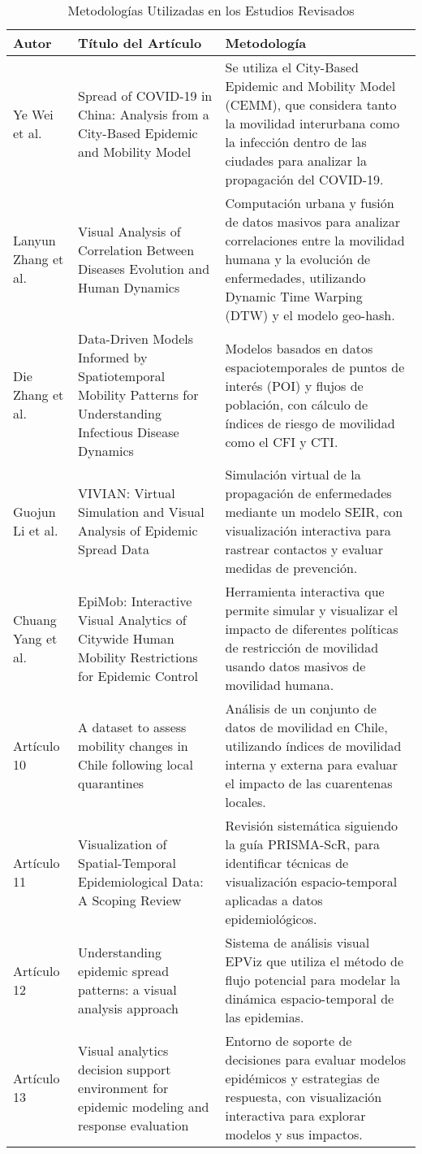 \documentclass[sigconf]{acmart}
\begin{document}
\begin{table*}[h]
\centering
\caption{Metodologías Utilizadas en los Estudios Revisados}
\begin{tabular}{|p{2cm}|p{3cm}|p{10cm}|}
\hline
\textbf{Autor} & \textbf{Título del Artículo} & \textbf{Metodología} \\ \hline
Ye Wei et al. & Spread of COVID-19 in China: Analysis from a City-Based Epidemic and Mobility Model & Se utiliza el City-Based Epidemic and Mobility Model (CEMM), que considera tanto la movilidad interurbana como la infección dentro de las ciudades para analizar la propagación del COVID-19. \\ \hline
Lanyun Zhang et al. & Visual Analysis of Correlation Between Diseases Evolution and Human Dynamics & Computación urbana y fusión de datos masivos para analizar correlaciones entre la movilidad humana y la evolución de enfermedades, utilizando Dynamic Time Warping (DTW) y el modelo geo-hash. \\ \hline
Die Zhang et al. & Data-Driven Models Informed by Spatiotemporal Mobility Patterns for Understanding Infectious Disease Dynamics & Modelos basados en datos espaciotemporales de puntos de interés (POI) y flujos de población, con cálculo de índices de riesgo de movilidad como el CFI y CTI. \\ \hline
Guojun Li et al. & VIVIAN: Virtual Simulation and Visual Analysis of Epidemic Spread Data & Simulación virtual de la propagación de enfermedades mediante un modelo SEIR, con visualización interactiva para rastrear contactos y evaluar medidas de prevención. \\ \hline
Chuang Yang et al. & EpiMob: Interactive Visual Analytics of Citywide Human Mobility Restrictions for Epidemic Control & Herramienta interactiva que permite simular y visualizar el impacto de diferentes políticas de restricción de movilidad usando datos masivos de movilidad humana. \\ \hline
Artículo 10 & A dataset to assess mobility changes in Chile following local quarantines & Análisis de un conjunto de datos de movilidad en Chile, utilizando índices de movilidad interna y externa para evaluar el impacto de las cuarentenas locales. \\ \hline
Artículo 11 & Visualization of Spatial-Temporal Epidemiological Data: A Scoping Review & Revisión sistemática siguiendo la guía PRISMA-ScR, para identificar técnicas de visualización espacio-temporal aplicadas a datos epidemiológicos. \\ \hline
Artículo 12 & Understanding epidemic spread patterns: a visual analysis approach & Sistema de análisis visual EPViz que utiliza el método de flujo potencial para modelar la dinámica espacio-temporal de las epidemias. \\ \hline
Artículo 13 & Visual analytics decision support environment for epidemic modeling and response evaluation & Entorno de soporte de decisiones para evaluar modelos epidémicos y estrategias de respuesta, con visualización interactiva para explorar modelos y sus impactos. \\ \hline
\end{tabular}
\label{tab:metodologias}
\end{table*}
\end{document}
